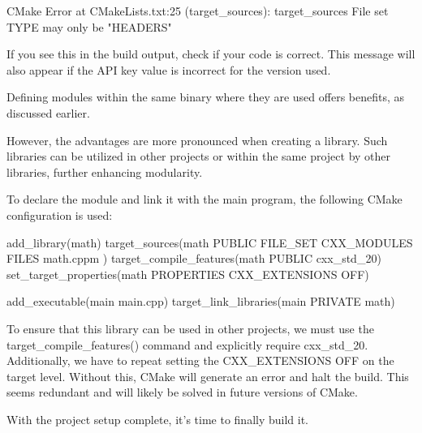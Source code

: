 \begin{shell}
CMake Error at CMakeLists.txt:25 (target_sources):
target_sources File set TYPE may only be "HEADERS"
\end{shell}

If you see this in the build output, check if your code is correct. This message will also appear if the API key value is incorrect for the version used.

Defining modules within the same binary where they are used offers benefits, as discussed earlier.

However, the advantages are more pronounced when creating a library. Such libraries can be utilized in other projects or within the same project by other libraries, further enhancing modularity.

To declare the module and link it with the main program, the following CMake configuration is used:


\begin{cmake}
add_library(math)
target_sources(math
    PUBLIC FILE_SET CXX_MODULES FILES math.cppm
)
target_compile_features(math PUBLIC cxx_std_20)
set_target_properties(math PROPERTIES CXX_EXTENSIONS OFF)

add_executable(main main.cpp)
target_link_libraries(main PRIVATE math)
\end{cmake}

To ensure that this library can be used in other projects, we must use the target\_compile\_features() command and explicitly require cxx\_std\_20. Additionally, we have to repeat setting the CXX\_EXTENSIONS OFF on the target level. Without this, CMake will generate an error and halt the build. This seems redundant and will likely be solved in future versions of CMake.

With the project setup complete, it’s time to finally build it.
